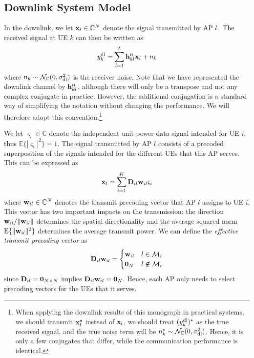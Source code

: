 \subsection{Downlink System Model} \label{sec:downlink-system-model-ch2}

In the downlink, we let $\mathbf{x}_l \in \mathbb{C}^N$ denote the signal transmitted by AP $l$.~The received signal at UE $k$ can then be written as
\begin{align} \label{eq:DCC-downlink-0}
y_k^{\rm{dl}} = \sum_{l=1}^{L}  \vect{h}_{kl}^{\Htran}\vect{x}_l + n_k
\end{align}
where $n_k \sim \mathcal{N}_{\mathbb{C}}(0,\sigma^2_{\mathrm{dl}})$ is the receiver noise.
Note that we have represented the downlink channel by $\vect{h}_{kl}^{\Htran}$, although there will only be a transpose and not any complex conjugate in practice.
However, the \linebreak additional conjugation is a standard way of simplifying the notation without changing the performance. We will therefore adopt this convention.\footnote{When applying the downlink results of this monograph in practical systems, we should transmit $\mathbf{x}_l^{\star}$ instead of $\mathbf{x}_l$, we should treat $(y_k^{\rm{dl}})^{\star}$ as the true received signal, and the true noise term will be $n_k^{\star}  \sim \mathcal{N}_{\mathbb{C}}(0,\sigma^2_{\mathrm{dl}})$. Hence, it is only a few conjugates that differ, while the communication performance is identical.}

We let $\varsigma_i \in \mathbb{C}$ denote the independent unit-power data signal intended for UE $i$, thus $\mathbb{E} \{{|\varsigma_i |^2}\} = 1$.
The signal transmitted by AP $l$ consists of a precoded superposition of the signals intended for the different UEs that this AP serves. This can be expressed as
\begin{align} 
\mathbf{x}_l = \sum_{i=1}^{K} \mathbf{D}_{il}  \mathbf{w}_{il} \varsigma_i \label{eq:DCC-transmit-downlink}
\end{align}
where  $\mathbf{w}_{il} \in \mathbb{C}^N$ denotes the transmit precoding vector that AP $l$ assigns to UE $i$. This vector has two important impacts on the transmission: the direction $\mathbf{w}_{il}/\|\mathbf{w}_{il}\|$ determines the spatial directionality and the average squared norm $\mathbb{E}\{ \| \mathbf{w}_{il} \|^2 \}$ determines the average transmit power.
We can define the \emph{effective transmit precoding vector} as
\begin{equation} \label{eq:effective-precoding}
\mathbf{D}_{il}  \mathbf{w}_{il} = \begin{cases} \mathbf{w}_{il} & l \in \mathcal{M}_i \\
\mathbf{0}_{N} & l \not \in \mathcal{M}_i
\end{cases}
\end{equation}
since $ \mathbf{D}_{il}=\mathbf{0}_{N\times N}$ implies $\mathbf{D}_{il}  \mathbf{w}_{il}=\mathbf{0}_N$. Hence, each AP only needs to select precoding vectors for the UEs that it serves.

